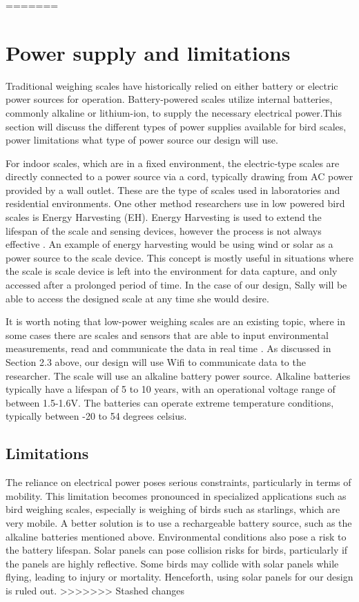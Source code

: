 \documentclass[class=report,11pt,crop=false]{standalone}
\begin{document}
=======
\section{Power supply and limitations}	
Traditional weighing scales have historically relied on either battery or electric power sources for operation. Battery-powered scales utilize internal batteries, commonly alkaline or lithium-ion, to supply the necessary electrical power.This section will discuss the different types of power supplies available for bird scales, power limitations what type of power source our design will use.

For indoor scales, which are in a fixed environment, the electric-type scales are directly connected to a power source via a cord, typically drawing from AC power provided by a wall outlet. These are the type of scales used in laboratories and residential environments. One other method researchers use in low powered bird scales is Energy Harvesting (EH). Energy Harvesting is used to extend the lifespan of the scale and sensing devices, however the process is not always effective \cite{EnergyHarvesting}. An example of energy harvesting would be using wind or solar as a power source to the scale device. This concept is mostly useful in situations where the scale is scale device is left into the environment for data capture, and only accessed after a prolonged period of time. In the case of our design, Sally will be able to access the designed scale at any time she would desire.  

It is worth noting that low-power weighing scales are an existing topic, where in some cases there are scales and sensors that are able to input environmental measurements, read and communicate the data in real time \cite{ImageBased}. As discussed in Section 2.3 above, our design will use Wifi to communicate data to the researcher. The scale will use an alkaline battery power source. Alkaline batteries typically have a lifespan of 5 to 10 years, with an operational voltage range of between 1.5-1.6V. The batteries can operate extreme temperature conditions, typically between -20 to 54 degrees celsius.

\subsection{Limitations}
The reliance on electrical power poses serious constraints, particularly in terms of mobility. This limitation becomes pronounced in specialized applications such as bird weighing scales, especially is weighing of birds such as starlings, which are very mobile. A better solution is to use a rechargeable battery source, such as the alkaline batteries mentioned above. Environmental conditions also pose a risk to the battery lifespan. Solar panels can pose collision risks for birds, particularly if the panels are highly reflective. Some birds may collide with solar panels while flying, leading to injury or mortality. Henceforth, using solar panels for our design is ruled out. 
>>>>>>> Stashed changes

\ifstandalone

\printnoidxglossary[type=\acronymtype,nonumberlist]
\fi
\end{document}
